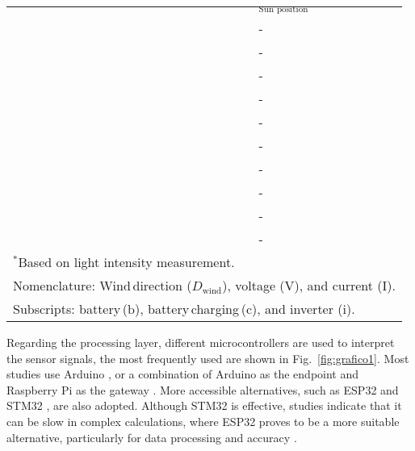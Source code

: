 \documentclass{ieeeaccess}
\begin{document}
\begin{table}[b!]
\begin{tabular}{lp{.3cm}p{.3cm}p{.3cm}p{.3cm}p{.3cm}p{.3cm}p{.3cm}l}
\cite{12}	&		&	\checkmark	&	\checkmark	&		&		&		&		&	$_\text{Sun position}$	\\

\cite{2}	&		&	\checkmark	&	\checkmark	&		&		&		&		&	-	\\

\cite{5}	&		&	\checkmark	&	\checkmark	&		&		&		&		&	-	\\

\cite{27}	&		&	\checkmark	&	\checkmark	&		&		&		&		&	-	\\

\cite{28}	&		&	\checkmark	&	\checkmark	&		&		&		&		&	-	\\

\cite{29}	&		&	\checkmark	&	\checkmark	&		&		&		&		&	-	\\

\cite{16}	&		&	\checkmark	&	\checkmark	&		&		&		&		&	-	\\

\cite{24}	&		&	\checkmark	&	\checkmark	&		&		&		&		&	-	\\

\cite{23}	&		&	\checkmark	&		&		&		&		&		&	-	\\

\cite{3}	&	\checkmark	&		&		&		&		&		&		&	-	\\

\cite{1}	&	\checkmark	&		&		&		&		&		&		&	-	\\
\hline
\hline
\multicolumn{9}{p{8cm}}{$^*$Based on light intensity measurement.}\\

\multicolumn{9}{p{8cm}}{Nomenclature: Wind\,direction ($D_\text{wind}$), voltage (V), and current (I).}\\

\multicolumn{9}{p{8cm}}{Subscripts: battery\,($\text{b}$), battery\,charging\,($\text{c}$), and inverter ($\text{i}$).}
\end{tabular}
	
\end{table}

Regarding the processing layer, different microcontrollers are used to interpret the sensor signals, the most frequently used are shown in Fig.~\ref{fig:grafico1}. Most studies use Arduino \cite{2,4,13,17,27,29}, or a combination of Arduino as the endpoint and Raspberry Pi as the gateway \cite{5,24,26,28}. More accessible alternatives, such as ESP32 \cite{8,20,22, 23} and STM32 \cite{11,15,16,25}, are also adopted. Although STM32 is effective, studies indicate that it can be slow in complex calculations, where ESP32 proves to be a more suitable alternative, particularly for data processing and accuracy \cite{16}.
\end{document}
